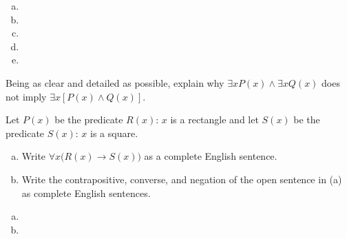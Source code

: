 \documentclass[11pt,letterpaper]{article}
\begin{document}
\sol
\begin{enumerate}[(a)]
\item 
\item 
\item 
\item 
\item 
\end{enumerate}



\newpage



 Being as clear and detailed as possible, explain why $\exists x P(x) \wedge \exists x Q(x)$ does not imply $\exists x [P(x) \wedge Q(x)]$. \pspace

\sol 



\newpage



 Let $P(x)$ be the predicate $R(x)$: $x$ is a rectangle and let $S(x)$ be the predicate $S(x)$: $x$ is a square. 
	\begin{enumerate}[(a)]
	\item Write $\forall x \big( R(x) \to S(x) \big)$ as a complete English sentence.
	\item Write the contrapositive, converse, and negation of the open sentence in (a) as complete English sentences. 
	\end{enumerate} \pspace

\sol
\begin{enumerate}[(a)]
\item 
\item 
\end{enumerate}
\end{document}
